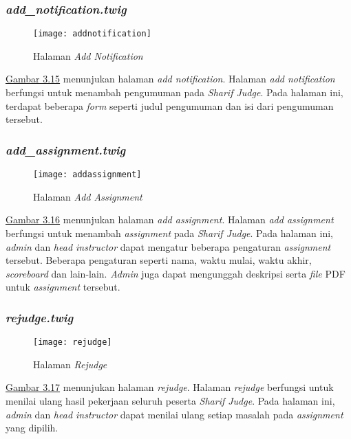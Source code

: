 \subsubsection{\textit{add\_notification.twig}}
\begin{figure}[H]
	\centering  
	\texttt{[image: addnotification]}  
	\caption[Halaman \textit{Add Notification}]{Halaman \textit{Add Notification}} 
	\label{fig:addnotification} 
\end{figure} 
\hyperref[fig:addnotification]{Gambar 3.15} menunjukan halaman \textit{add notification}. Halaman \textit{add notification} berfungsi untuk menambah pengumuman pada \textit{Sharif Judge}. Pada halaman ini, terdapat beberapa \textit{form} seperti judul pengumuman dan isi dari pengumuman tersebut.  

\subsubsection{\textit{add\_assignment.twig}}
\begin{figure}[H]
	\centering  
	\texttt{[image: addassignment]}  
	\caption[Halaman \textit{Add Assignment}]{Halaman \textit{Add Assignment}} 
	\label{fig:addassignment} 
\end{figure} 
\hyperref[fig:addassignment]{Gambar 3.16} menunjukan halaman \textit{add assignment}. Halaman \textit{add assignment} berfungsi untuk menambah \textit{assignment} pada \textit{Sharif Judge}. Pada halaman ini, \textit{admin} dan \textit{head instructor} dapat mengatur beberapa pengaturan \textit{assignment} tersebut. Beberapa pengaturan seperti nama, waktu mulai, waktu akhir, \textit{scoreboard} dan lain-lain. \textit{Admin} juga dapat mengunggah deskripsi serta \textit{file} PDF untuk \textit{assignment} tersebut.

\subsubsection{\textit{rejudge.twig}}
\begin{figure}[H]
	\centering  
	\texttt{[image: rejudge]}  
	\caption[Halaman \textit{Rejudge}]{Halaman \textit{Rejudge}} 
	\label{fig:rejudge} 
\end{figure} 
\hyperref[fig:rejudge]{Gambar 3.17} menunjukan halaman \textit{rejudge}. Halaman \textit{rejudge} berfungsi untuk menilai ulang hasil pekerjaan seluruh peserta \textit{Sharif Judge}. Pada halaman ini, \textit{admin} dan \textit{head instructor} dapat menilai ulang setiap masalah pada \textit{assignment} yang dipilih.

